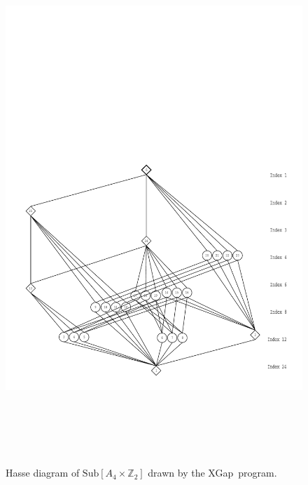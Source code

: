 \documentclass[11pt]{amsart}
\newcommand{\xgap}{XGap}   %
\theoremstyle{plain}
\newcommand{\<}{\ensuremath{\langle}}
\renewcommand{\>}{\ensuremath{\rangle}}
\newcommand{\Sub}{\ensuremath{\mathrm{Sub}}}
\newcommand{\Z}{\ensuremath{\mathbb{Z}}}
\begin{document}
\begin{enumerate}
\begin{figure}[h!]
\begin{center}
\includegraphics[height=20cm]{a4c2new.pdf}%
\caption{Hasse diagram of $\Sub[A_4 \times \Z_2]$ drawn by the \xgap\ program.}
\label{fig:a4c2}
\end{center}\end{figure}
\begin{figure}[h!]\begin{center}
\vspace{-8cm}

\end{center}
\end{figure}
\end{enumerate}
\end{document}

